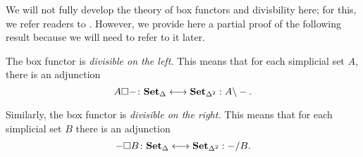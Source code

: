 \documentclass[main.tex]{subfiles}
\begin{document}
We will not fully develop the theory of box functors and divisbility here; for this, we refer readers to \cite{qcats_vs_segal_spaces}. However, we provide here a partial proof of the following result because we will need to refer to it later.
\begin{proposition}
  \label{prop:bijection_exhibiting_box_divisibility}
  The box functor is \emph{divisible on the left.} This means that for each simplicial set $A$, there is an adjunction
  \begin{equation*}
    A \square -\colon \mathbf{Set}_{\Delta} \longleftrightarrow \mathbf{Set}_{\Delta^{2}} : A \backslash -.
  \end{equation*}

  Similarly, the box functor is \emph{divisible on the right.} This means that for each simplicial set $B$ there is an adjunction
  \begin{equation*}
    - \square B\colon \mathbf{Set}_{\Delta} \longleftrightarrow \mathbf{Set}_{\Delta^{2}} : - / B.
  \end{equation*}
\end{proposition}
\end{document}
